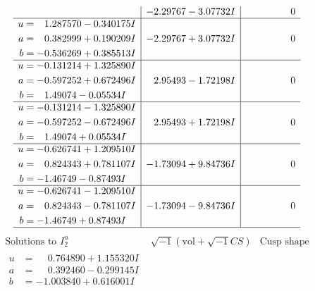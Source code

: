 \documentclass[1p]{elsarticle_modified}
\theoremstyle{definition}
\newcommand{\I}{\sqrt{-1}}
\begin{document}
$$\begin{array}{c|c|c}
 & -2.29767 - 3.07732 I & \phantom{-0.000000 } 0 \\ \hline\begin{aligned}
u &= \phantom{-}1.287570 - 0.340175 I \\
a &= \phantom{-}0.382999 + 0.190209 I \\
b &= -0.536269 + 0.385513 I\end{aligned}
 & -2.29767 + 3.07732 I & \phantom{-0.000000 } 0 \\ \hline\begin{aligned}
u &= -0.131214 + 1.325890 I \\
a &= -0.597252 + 0.672496 I \\
b &= \phantom{-}1.49074 - 0.05534 I\end{aligned}
 & \phantom{-}2.95493 - 1.72198 I & \phantom{-0.000000 } 0 \\ \hline\begin{aligned}
u &= -0.131214 - 1.325890 I \\
a &= -0.597252 - 0.672496 I \\
b &= \phantom{-}1.49074 + 0.05534 I\end{aligned}
 & \phantom{-}2.95493 + 1.72198 I & \phantom{-0.000000 } 0 \\ \hline\begin{aligned}
u &= -0.626741 + 1.209510 I \\
a &= \phantom{-}0.824343 + 0.781107 I \\
b &= -1.46749 - 0.87493 I\end{aligned}
 & -1.73094 + 9.84736 I & \phantom{-0.000000 } 0 \\ \hline\begin{aligned}
u &= -0.626741 - 1.209510 I \\
a &= \phantom{-}0.824343 - 0.781107 I \\
b &= -1.46749 + 0.87493 I\end{aligned}
 & -1.73094 - 9.84736 I & \phantom{-0.000000 } 0\\
 \hline 
 \end{array}$$\newpage$$\begin{array}{c|c|c}  
\text{Solutions to }I^u_{2}& \I (\text{vol} + \sqrt{-1}CS) & \text{Cusp shape}\\
 \hline 
\begin{aligned}
u &= \phantom{-}0.764890 + 1.155320 I \\
a &= \phantom{-}0.392460 - 0.299145 I \\
b &= -1.003840 + 0.616001 I\end{aligned}

\end{array}$$
\end{document}
